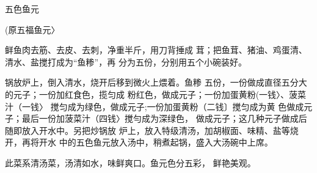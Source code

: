 \begin{recipe}{五色鱼元}

(原五福鱼元〉

\ingredients


\cooking

\step 	鲜鱼肉去筋、去皮、去刺，净重半斤，用刀背捶成 茸；把鱼茸、猪油、鸡蛋清、清水、盐搅打成为“鱼糁”，再 分为五份，分别用五个小碗装好。

\step 	锅放炉上，倒入清水，烧开后移到微火上煨着。鱼糁 五份，一份做成直径五分大的元子；一份加红食色，揽匀成 粉红色，做成元子；一份加蛋黄粉(一钱〉、菠菜汁（一钱〉 搅匀成为绿色，做成元子;一份加蛋黄粉（二钱〕搅匀成为黄 色做成元子；最后一份加菠菜汁（四钱〉搅勻成为深绿色， 做成元子；这几种元子做成后随即放入开水中。另把炒锅放 炉上，放入特级清汤，加胡椒面、味精、盐等烧开，再将开水 中的五色鱼元放入汤中，稍煮起锅，盛入大汤碗中上席。

\notes

此菜系清汤菜，汤清如水，味鲜爽口。鱼元色分五彩， 鲜艳美观。

\end{recipe}

